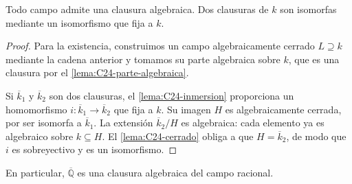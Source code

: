 \begin{teo}\label{teo:C24-clausura}
Todo campo admite una clausura algebraica. Dos clausuras de $k$ son isomorfas mediante un isomorfismo que fija a $k$.
\end{teo}
\begin{proof}
Para la existencia, construimos un campo algebraicamente cerrado $L\supseteq k$ mediante la cadena anterior y tomamos su parte algebraica sobre $k$, que es una clausura por el \cref{lema:C24-parte-algebraica}.

Si $\overline k_1$ y $\overline k_2$ son dos clausuras, el \cref{lema:C24-inmersion} proporciona un homomorfismo $i:\overline k_1\to\overline k_2$ que fija a $k$. Su imagen $H$ es algebraicamente cerrada, por ser isomorfa a $\overline k_1$. La extensión $\overline k_2/H$ es algebraica: cada elemento ya es algebraico sobre $k\subseteq H$. El \cref{lema:C24-cerrado} obliga a que $H=\overline k_2$, de modo que $i$ es sobreyectivo y es un isomorfismo.
\end{proof}
En particular, $\overline{\mathbb Q}$ es una clausura algebraica del campo racional.
